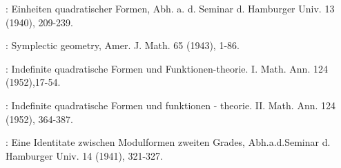 \begin{thebibliography}{99}
: Einheiten quadratischer Formen,
  Abh. a. d. Seminar d. Hamburger Univ. 13   (1940), 209-239. 

: Symplectic geometry, Amer. J. Math. 65
  (1943), 1-86. 

: Indefinite quadratische Formen und
  Funktionen-theorie. I. Math. Ann. 124   (1952),17-54. 

: Indefinite quadratische Formen und
  funktionen - theorie. II. Math. Ann. 124   (1952), 364-387. 

: Eine Identitate zwischen Modulformen zweiten
  Grades, Abh.a.d.Seminar d. Hamburger Univ. 14   (1941), 321-327. 
\end{thebibliography}
 
